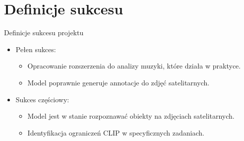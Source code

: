 \documentclass{beamer}
\begin{document}
\section{Definicje sukcesu}
\begin{frame}{Definicje sukcesu projektu}
  \begin{itemize}
    \item Pełen sukces:
      \begin{itemize}
        \item Opracowanie rozszerzenia do analizy muzyki, które działa w praktyce.
        \item Model poprawnie generuje annotacje do zdjęć satelitarnych.
      \end{itemize}
    \item Sukces częściowy:
      \begin{itemize}
        \item Model jest w stanie rozpoznawać obiekty na zdjęciach satelitarnych.
        \item Identyfikacja ograniczeń CLIP w specyficznych zadaniach.
      \end{itemize}
  \end{itemize}
\end{frame}
\end{document}
